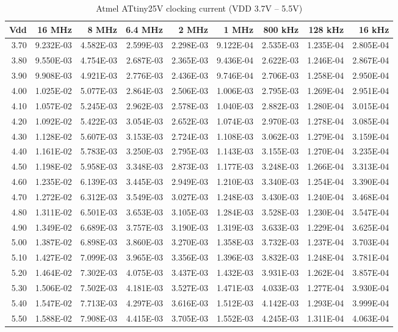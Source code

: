 \begin{table}
\begin{centering}
\begin{tabular}{|r|r|r|r|r|r|r|r|r|}
\hline
Vdd  & 16 MHz  & 8 MHz  & 6.4 MHz  & 2 MHz  & 1 MHz  & 800 kHz  & 128 kHz  & 16 kHz \tabularnewline
\hline
3.70  & 9.232E-03  & 4.582E-03  & 2.599E-03  & 2.298E-03  & 9.122E-04  & 2.535E-03  & 1.235E-04  & 2.805E-04 \tabularnewline
3.80  & 9.550E-03  & 4.754E-03  & 2.687E-03  & 2.365E-03  & 9.436E-04  & 2.622E-03  & 1.246E-04  & 2.867E-04 \tabularnewline
3.90  & 9.908E-03  & 4.921E-03  & 2.776E-03  & 2.436E-03  & 9.746E-04  & 2.706E-03  & 1.258E-04  & 2.950E-04 \tabularnewline
4.00  & 1.025E-02  & 5.077E-03  & 2.864E-03  & 2.506E-03  & 1.006E-03  & 2.795E-03  & 1.269E-04  & 2.951E-04 \tabularnewline
4.10  & 1.057E-02  & 5.245E-03  & 2.962E-03  & 2.578E-03  & 1.040E-03  & 2.882E-03  & 1.280E-04  & 3.015E-04 \tabularnewline
4.20  & 1.092E-02  & 5.422E-03  & 3.054E-03  & 2.652E-03  & 1.074E-03  & 2.970E-03  & 1.278E-04  & 3.085E-04 \tabularnewline
4.30  & 1.128E-02  & 5.607E-03  & 3.153E-03  & 2.724E-03  & 1.108E-03  & 3.062E-03  & 1.279E-04  & 3.159E-04 \tabularnewline
4.40  & 1.161E-02  & 5.783E-03  & 3.250E-03  & 2.795E-03  & 1.143E-03  & 3.155E-03  & 1.270E-04  & 3.235E-04 \tabularnewline
4.50  & 1.198E-02  & 5.958E-03  & 3.348E-03  & 2.873E-03  & 1.177E-03  & 3.248E-03  & 1.266E-04  & 3.313E-04 \tabularnewline
4.60  & 1.235E-02  & 6.139E-03  & 3.445E-03  & 2.949E-03  & 1.210E-03  & 3.340E-03  & 1.254E-04  & 3.390E-04 \tabularnewline
4.70  & 1.272E-02  & 6.312E-03  & 3.549E-03  & 3.027E-03  & 1.248E-03  & 3.430E-03  & 1.240E-04  & 3.468E-04 \tabularnewline
4.80  & 1.311E-02  & 6.501E-03  & 3.653E-03  & 3.105E-03  & 1.284E-03  & 3.528E-03  & 1.230E-04  & 3.547E-04 \tabularnewline
4.90  & 1.349E-02  & 6.689E-03  & 3.757E-03  & 3.190E-03  & 1.319E-03  & 3.633E-03  & 1.229E-04  & 3.625E-04 \tabularnewline
5.00  & 1.387E-02  & 6.898E-03  & 3.860E-03  & 3.270E-03  & 1.358E-03  & 3.732E-03  & 1.237E-04  & 3.703E-04 \tabularnewline
5.10  & 1.427E-02  & 7.099E-03  & 3.965E-03  & 3.356E-03  & 1.396E-03  & 3.832E-03  & 1.248E-04  & 3.781E-04 \tabularnewline
5.20  & 1.464E-02  & 7.302E-03  & 4.075E-03  & 3.437E-03  & 1.432E-03  & 3.931E-03  & 1.262E-04  & 3.857E-04 \tabularnewline
5.30  & 1.506E-02  & 7.502E-03  & 4.181E-03  & 3.527E-03  & 1.471E-03  & 4.033E-03  & 1.277E-04  & 3.930E-04 \tabularnewline
5.40  & 1.547E-02  & 7.713E-03  & 4.297E-03  & 3.616E-03  & 1.512E-03  & 4.142E-03  & 1.293E-04  & 3.999E-04 \tabularnewline
5.50  & 1.588E-02  & 7.908E-03  & 4.415E-03  & 3.705E-03  & 1.552E-03  & 4.245E-03  & 1.311E-04  & 4.063E-04 \tabularnewline
\hline
\end{tabular}
\par\end{centering}

\protect\caption{Atmel ATtiny25V clocking current (VDD 3.7V -- 5.5V)}


\end{table}
